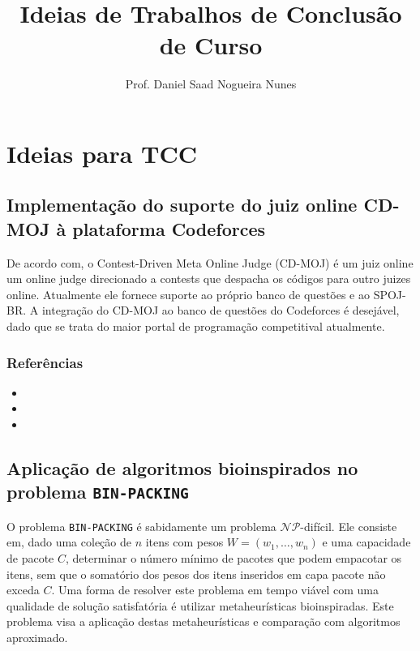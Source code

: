 \documentclass{article}
\author{Prof. Daniel Saad Nogueira Nunes}
\title{Ideias de Trabalhos de Conclusão de Curso}
\date{}
\newcommand*{\nsubsection}[1]{
    \subsection*{#1}
}
\begin{document}
\maketitle
\setcounter{tocdepth}{2}
\setcounter{secnumdepth}{2}
\tableofcontents
{}	


\newpage


\section{Ideias para TCC}

\nsubsection{Implementação do suporte do juiz online CD-MOJ à plataforma Codeforces}

De acordo com, o Contest-Driven Meta Online Judge (CD-MOJ) é um juiz online um
online judge direcionado a contests que despacha os códigos para outro juizes
online. Atualmente ele fornece suporte ao próprio banco de questões e ao
SPOJ-BR. A integração do CD-MOJ ao banco de questões do Codeforces é desejável, dado que se trata do
maior portal de programação competitival atualmente.



\subsubsection*{Referências}

\begin{itemize}
	\item {}
	\item {}
	\item {}
\end{itemize}

\nsubsection{Aplicação de algoritmos bioinspirados no problema {\tt BIN-PACKING}}

O problema {\tt BIN-PACKING} é sabidamente um problema $\mathcal{N\!P}$-difícil. Ele consiste em, dado uma coleção de $n$ itens com pesos $W=(w_1,\ldots,w_n)$ e uma capacidade de pacote $C$, determinar o número mínimo de pacotes que podem empacotar os itens, sem que o somatório dos pesos dos itens inseridos em capa pacote não exceda $C$. Uma forma de resolver este problema em tempo viável com uma qualidade de solução satisfatória é utilizar metaheurísticas bioinspiradas. Este problema visa a aplicação destas metaheurísticas e comparação com algoritmos aproximado.
\end{document}
